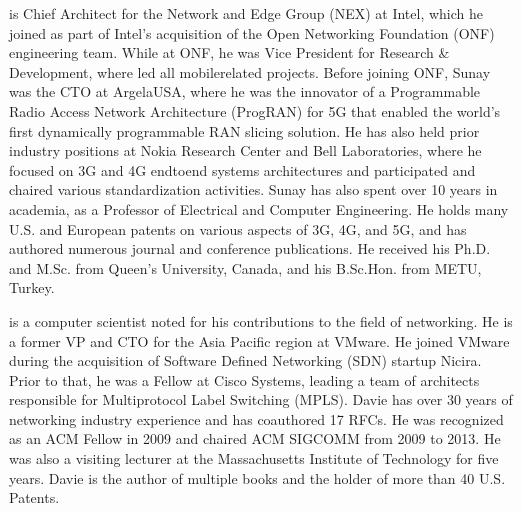 \documentclass[a4paper,11pt,english]{sphinxmanual}
\begin{document}
\sphinxAtStartPar
{} is Chief Architect for the Network and Edge Group (NEX)
at Intel, which he joined as part of Intel’s acquisition of the Open
Networking Foundation (ONF) engineering team. While at ONF, he was
Vice President for Research \& Development, where led all
mobile\sphinxhyphen{}related projects.  Before joining ONF, Sunay was the CTO at
Argela\sphinxhyphen{}USA, where he was the innovator of a Programmable Radio Access
Network Architecture (ProgRAN) for 5G that enabled the world’s first
dynamically programmable RAN slicing solution. He has also held prior
industry positions at Nokia Research Center and Bell Laboratories,
where he focused on 3G and 4G end\sphinxhyphen{}to\sphinxhyphen{}end systems architectures and
participated and chaired various standardization activities. Sunay has
also spent over 10 years in academia, as a Professor of Electrical and
Computer Engineering. He holds many U.S. and European patents on
various aspects of 3G, 4G, and 5G, and has authored numerous journal
and conference publications. He received his Ph.D. and M.Sc. from
Queen’s University, Canada, and his B.Sc.Hon. from METU, Turkey.

\sphinxAtStartPar
{} is a computer scientist noted for his contributions to
the field of networking. He is a former VP and CTO for the Asia
Pacific region at VMware. He joined VMware during the acquisition of
Software Defined Networking (SDN) startup Nicira. Prior to that, he
was a Fellow at Cisco Systems, leading a team of architects
responsible for Multiprotocol Label Switching (MPLS). Davie has over
30 years of networking industry experience and has co\sphinxhyphen{}authored 17
RFCs. He was recognized as an ACM Fellow in 2009 and chaired ACM
SIGCOMM from 2009 to 2013. He was also a visiting lecturer at the
Massachusetts Institute of Technology for five years. Davie is the
author of multiple books and the holder of more than 40 U.S. Patents.

\renewcommand{\indexname}{Index}
\printindex
\end{document}
